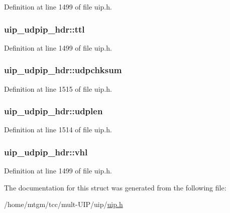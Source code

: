 Definition at line 1499 of file uip.h.

\hypertarget{structuip__udpip__hdr_a6f8c65cfc8242197bcc3cb5b4735b16f}{
\subsubsection[{ttl}]{ {\bf uip\_\-udpip\_\-hdr::ttl}}}
\label{structuip__udpip__hdr_a6f8c65cfc8242197bcc3cb5b4735b16f}


Definition at line 1499 of file uip.h.

\hypertarget{structuip__udpip__hdr_a858f970feb7462871c814953697a8ad7}{
\subsubsection[{udpchksum}]{ {\bf uip\_\-udpip\_\-hdr::udpchksum}}}
\label{structuip__udpip__hdr_a858f970feb7462871c814953697a8ad7}


Definition at line 1515 of file uip.h.

\hypertarget{structuip__udpip__hdr_ac92d2f194f096e84791f95d7e8f0ba92}{
\subsubsection[{udplen}]{ {\bf uip\_\-udpip\_\-hdr::udplen}}}
\label{structuip__udpip__hdr_ac92d2f194f096e84791f95d7e8f0ba92}


Definition at line 1514 of file uip.h.

\hypertarget{structuip__udpip__hdr_af1684ad96b8acf54154688df3883b801}{
\subsubsection[{vhl}]{ {\bf uip\_\-udpip\_\-hdr::vhl}}}
\label{structuip__udpip__hdr_af1684ad96b8acf54154688df3883b801}


Definition at line 1499 of file uip.h.



The documentation for this struct was generated from the following file:\begin{DoxyCompactItemize}
\item 
/home/mtgm/tcc/mult-\/UIP/uip/\hyperlink{uip_8h}{uip.h}\end{DoxyCompactItemize}
